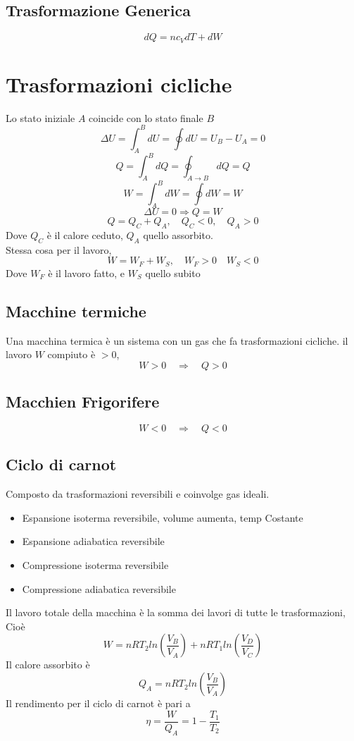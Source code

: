 \documentclass[a4paper]{report}
\begin{document}
  \subsection{Trasformazione Generica}
  $$ dQ = nc_V dT + dW $$

  \section{Trasformazioni cicliche}
  Lo stato iniziale $A$ coincide con lo stato finale $B$
  $$ \Delta U = \int_A^B dU = \oint dU = U_B - U_A = 0 $$
  $$ Q = \int_A^B dQ = \oint_{A \rightarrow B} dQ = Q $$
  $$ W = \int_A^B dW = \oint dW = W $$
  $$ \Delta U = 0 \Rightarrow Q = W $$
  $$ Q = Q_C + Q_A,  \quad Q_C < 0, \quad Q_A > 0 $$
  Dove $Q_C$ è il calore ceduto, $Q_A$ quello assorbito.\\
  Stessa cosa per il lavoro,
  $$ W = W_F + W_S, \quad W_F > 0  \quad W_S < 0 $$
  Dove $W_F$ è il lavoro fatto, e $W_S$ quello subito
  \subsection{Macchine termiche}
  Una macchina termica è un sistema con un gas che fa trasformazioni cicliche.
  il lavoro $W$ compiuto è $>0$,
  $$ W>0 \quad \Rightarrow \quad Q > 0 $$
  \subsection{Macchien Frigorifere}
  $$ W<0 \quad \Rightarrow \quad Q < 0 $$

  \subsection{Ciclo di carnot}
  Composto da trasformazioni reversibili e coinvolge gas ideali.
  \begin{itemize}
    \item Espansione isoterma reversibile, volume aumenta, temp Costante
    \item Espansione adiabatica reversibile
    \item Compressione isoterma reversibile
    \item Compressione adiabatica reversibile
  \end{itemize}
  Il lavoro totale della macchina è la somma dei lavori di tutte le trasformazioni, Cioè
  $$ W= nRT_2 ln (\frac{V_B}{V_A}) + nR T_1 ln (\frac{V_D}{V_C})$$
  Il calore assorbito è
  $$ Q_A = nRT_2 ln(\frac{V_B}{V_A})$$
  Il rendimento per il ciclo di carnot è pari a
  $$\eta = \frac{W}{Q_A} = 1 - \frac{T_1}{T_2}$$
\end{document}
